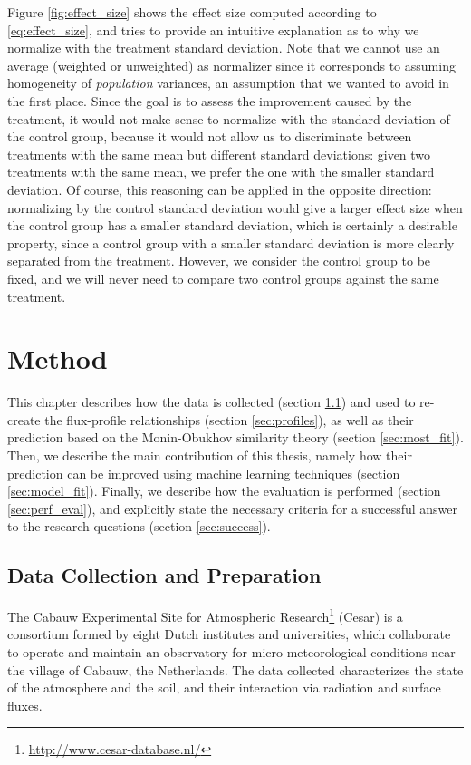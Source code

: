 \documentclass[a4paper]{book}
\begin{document}
Figure \ref{fig:effect_size} shows the effect size computed according to \ref{eq:effect_size}, and tries to provide an intuitive explanation as to why we normalize with the treatment standard deviation. Note that we cannot use an average (weighted or unweighted) as normalizer since it corresponds to assuming homogeneity of \emph{population} variances, an assumption that we wanted to avoid in the first place. Since the goal is to assess the improvement caused by the treatment, it would not make sense to normalize with the standard deviation of the control group, because it would not allow us to discriminate between treatments with the same mean but different standard deviations: given two treatments with the same mean, we prefer the one with the smaller standard deviation. Of course, this reasoning can be applied in the opposite direction: normalizing by the control standard deviation would give a larger effect size when the control group has a smaller standard deviation, which is certainly a desirable property, since a control group with a smaller standard deviation is more clearly separated from the treatment. However, we consider the control group to be fixed, and we will never need to compare two control groups against the same treatment.



\chapter{Method}
\label{ch:method}
This chapter describes how the data is collected (section \ref{sec:data_collection}) and used to re-create the flux-profile relationships (section \ref{sec:profiles}), as well as their prediction based on the Monin-Obukhov similarity theory (section \ref{sec:most_fit}). Then, we describe the main contribution of this thesis, namely how their prediction can be improved using machine learning techniques (section \ref{sec:model_fit}). Finally, we describe how the evaluation is performed (section \ref{sec:perf_eval}), and explicitly state the necessary criteria for a successful answer to the research questions (section  \ref{sec:success}).

\section{Data Collection and Preparation}
\label{sec:data_collection}
The Cabauw Experimental Site for Atmospheric Research\footnote{\url{http://www.cesar-database.nl/}} (Cesar) is a consortium formed by eight Dutch institutes and universities, which collaborate to operate and maintain an observatory for micro-meteorological conditions near the village of Cabauw, the Netherlands. The data collected characterizes the state of the atmosphere and the soil, and their interaction via radiation and surface fluxes.
\end{document}
